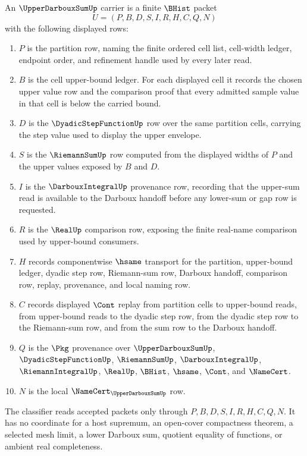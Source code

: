 \begin{definition}\label{def:upper-darboux-sum-carrier}
An $\UpperDarbouxSumUp$ carrier is a finite $\BHist$ packet
$$
U=(P,B,D,S,I,R,H,C,Q,N)
$$
with the following displayed rows:
\begin{enumerate}
\item $P$ is the partition row, naming the finite ordered cell list, cell-width ledger, endpoint order, and refinement handle used by every later read.
\item $B$ is the cell upper-bound ledger. For each displayed cell it records the chosen upper value row and the comparison proof that every admitted sample value in that cell is below the carried bound.
\item $D$ is the $\DyadicStepFunctionUp$ row over the same partition cells, carrying the step value used to display the upper envelope.
\item $S$ is the $\RiemannSumUp$ row computed from the displayed widths of $P$ and the upper values exposed by $B$ and $D$.
\item $I$ is the $\DarbouxIntegralUp$ provenance row, recording that the upper-sum read is available to the Darboux handoff before any lower-sum or gap row is requested.
\item $R$ is the $\RealUp$ comparison row, exposing the finite real-name comparison used by upper-bound consumers.
\item $H$ records componentwise $\hsame$ transport for the partition, upper-bound ledger, dyadic step row, Riemann-sum row, Darboux handoff, comparison row, replay, provenance, and local naming row.
\item $C$ records displayed $\Cont$ replay from partition cells to upper-bound reads, from upper-bound reads to the dyadic step row, from the dyadic step row to the Riemann-sum row, and from the sum row to the Darboux handoff.
\item $Q$ is the $\Pkg$ provenance over $\UpperDarbouxSumUp$, $\DyadicStepFunctionUp$, $\RiemannSumUp$, $\DarbouxIntegralUp$, $\RiemannIntegralUp$, $\RealUp$, $\BHist$, $\hsame$, $\Cont$, and $\NameCert$.
\item $N$ is the local $\NameCert_{\UpperDarbouxSumUp}$ row.
\end{enumerate}
The classifier reads accepted packets only through $P,B,D,S,I,R,H,C,Q,N$. It has no coordinate for a host supremum, an open-cover compactness theorem, a selected mesh limit, a lower Darboux sum, quotient equality of functions, or ambient real completeness.
\end{definition}

